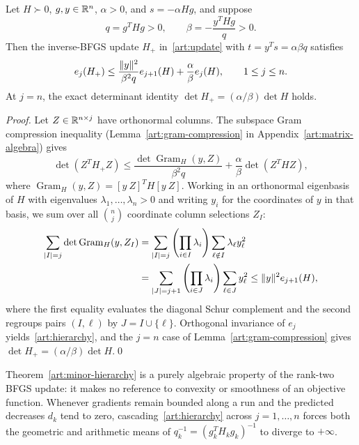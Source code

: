 \begin{theorem}\label{art:minor-hierarchy}
Let $H\succ0$, $g,y\in\mathbb R^n$, $\alpha>0$, and $s=-\alpha Hg$, and suppose
\[
 q=g^THg>0,\qquad \beta=-\frac{y^THg}{q}>0.
\]
Then the inverse-BFGS update $H_+$ in~\eqref{art:update} with $t=y^Ts=\alpha\beta q$
satisfies
\begin{equation}\label{art:hierarchy}
 e_j(H_+)\le\frac{\lVert y\rVert^2}{\beta^2q}e_{j+1}(H)
                   +\frac\alpha\beta e_j(H),\qquad 1\le j\le n.
\end{equation}
At $j=n$, the exact determinant identity $\det H_+=(\alpha/\beta)\det H$ holds.
\end{theorem}
\begin{proof}
Let $Z\in\mathbb R^{n\times j}$ have orthonormal columns. The subspace Gram compression
inequality (Lemma~\ref{art:gram-compression} in Appendix~\ref{art:matrix-algebra})
gives
\[
 \det(Z^TH_+Z)\le
 \frac{\det\operatorname{Gram}_H(y,Z)}{\beta^2q}
       +\frac\alpha\beta\det(Z^THZ),
\]
where $\operatorname{Gram}_H(y,Z)=[y\ Z]^TH[y\ Z]$. Working in an orthonormal
eigenbasis of $H$ with eigenvalues $\lambda_1,\ldots,\lambda_n>0$ and writing
$y_i$ for the coordinates of $y$ in that basis, we sum over all $\binom{n}{j}$
coordinate column selections $Z_I$:
\begin{align*}
 \sum_{|I|=j}\det\operatorname{Gram}_H(y,Z_I)
 &=\sum_{|I|=j}\left(\prod_{i\in I}\lambda_i\right)
                  \sum_{\ell\notin I}\lambda_\ell y_\ell^2\\
 &=\sum_{|J|=j+1}\left(\prod_{i\in J}\lambda_i\right)
                  \sum_{\ell\in J}y_\ell^2
 \le\lVert y\rVert^2e_{j+1}(H),
\end{align*}
where the first equality evaluates the diagonal Schur complement and the second
regroups pairs $(I,\ell)$ by $J=I\cup\{\ell\}$. Orthogonal invariance of $e_j$
yields~\eqref{art:hierarchy}, and the $j=n$ case of
Lemma~\ref{art:gram-compression} gives $\det H_+=(\alpha/\beta)\det H$.\qed
\end{proof}

Theorem~\ref{art:minor-hierarchy} is a purely algebraic property of
the rank-two BFGS update: it makes no reference to convexity or smoothness of an
objective function. Whenever gradients remain bounded along a run and the
predicted decreases $d_k$ tend to zero, cascading~\eqref{art:hierarchy} across
$j=1,\ldots,n$ forces both the geometric and arithmetic means of
$q_k^{-1}=(g_k^TH_kg_k)^{-1}$ to diverge to $+\infty$.

